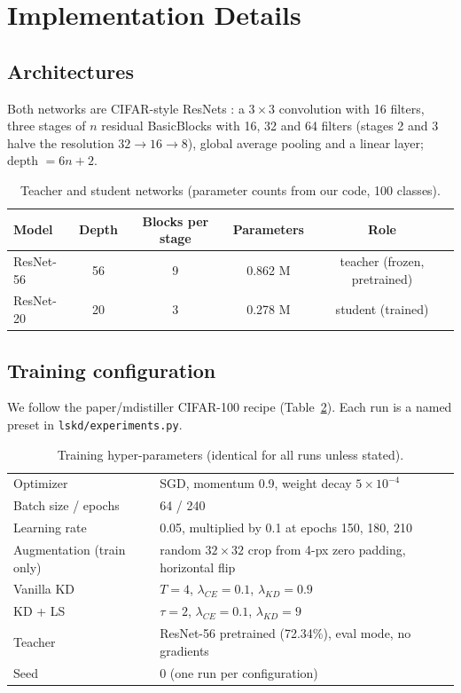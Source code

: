 \documentclass[12pt,a4paper]{article}
\begin{document}
\section{Implementation Details}
\label{sec:impl}

\subsection{Architectures}
Both networks are CIFAR-style ResNets \cite{he2016}: a $3{\times}3$ convolution with 16 filters, three stages of $n$ residual BasicBlocks with 16, 32 and 64 filters (stages 2 and 3 halve the resolution $32\to16\to8$), global average pooling and a linear layer; depth $=6n+2$.

\begin{table}[H]
\centering
\caption{Teacher and student networks (parameter counts from our code, 100 classes).}
\label{tab:arch}
\begin{tabular}{lcccc}
\toprule
Model & Depth & Blocks per stage & Parameters & Role \\
\midrule
ResNet-56 & 56 & 9 & 0.862 M & teacher (frozen, pretrained) \\
ResNet-20 & 20 & 3 & 0.278 M & student (trained) \\
\bottomrule
\end{tabular}
\end{table}

\subsection{Training configuration}
We follow the paper/mdistiller CIFAR-100 recipe (Table~\ref{tab:hparams}). Each run is a named preset in \texttt{lskd/experiments.py}.

\begin{table}[H]
\centering
\caption{Training hyper-parameters (identical for all runs unless stated).}
\label{tab:hparams}
\begin{tabular}{ll}
\toprule
Optimizer & SGD, momentum 0.9, weight decay $5\times10^{-4}$ \\
Batch size / epochs & 64 / 240 \\
Learning rate & 0.05, multiplied by 0.1 at epochs 150, 180, 210 \\
Augmentation (train only) & random $32{\times}32$ crop from 4-px zero padding, horizontal flip \\
Vanilla KD & $T=4$, $\lambda_{CE}=0.1$, $\lambda_{KD}=0.9$ \\
KD + LS & $\tau=2$, $\lambda_{CE}=0.1$, $\lambda_{KD}=9$ \\
Teacher & ResNet-56 pretrained (72.34\%), eval mode, no gradients \\
Seed & 0 (one run per configuration) \\
\bottomrule
\end{tabular}
\end{table}
\end{document}
